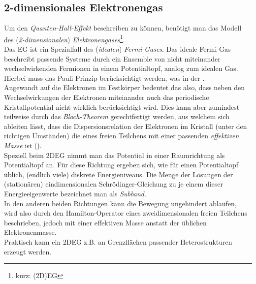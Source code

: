 \subsection{2-dimensionales Elektronengas}
Um den \emph{Quanten-Hall-Effekt} beschreiben zu können, benötigt man das Modell des (\emph{2-dimensionalen}) \emph{Elektronengases}\footnote{kurz: (2D)EG}.\\
Das EG ist ein Spezialfall des (\emph{idealen}) \emph{Fermi-Gases}. Das ideale Fermi-Gas beschreibt passende Systeme durch ein Ensemble von nicht miteinander wechselwirkenden Fermionen in einem Potentialtopf, analog zum idealen Gas. Hierbei muss das Pauli-Prinzip berücksichtigt werden, was in der .\\
Angewandt auf die Elektronen im Festkörper bedeutet das also, dass neben den Wechselwirkungen der Elektronen miteinander auch das periodische Kristallpotential nicht wirklich berücksichtigt wird. Dies kann aber zumindest teilweise durch das \emph{Bloch-Theorem} gerechtfertigt werden, aus welchem sich ableiten lässt, dass die Dispersionsrelation der Elektronen im Kristall (unter den richtigen Umständen) die eines freien Teilchens mit einer passenden \emph{effektiven Masse} ist (\cite{Cz15}).\\
Speziell beim 2DEG nimmt man das Potential in einer Raumrichtung als Potentialtopf an. Für diese Richtung ergeben sich, wie für einen Potentialtopf üblich, (endlich viele) diskrete Energieniveaus. Die Menge der Lösungen der (stationären) eindimensionalen Schrödinger-Gleichung zu je einem dieser Energieeigenwerte bezeichnet man als \emph{Subband}.\\
In den anderen beiden Richtungen kann die Bewegung ungehindert ablaufen, wird also durch den Hamilton-Operator eines zweidimensionalen freien Teilchens beschrieben, jedoch mit einer effektiven Masse anstatt der üblichen Elektronenmasse.\\
Praktisch kann ein 2DEG z.B. an Grenzflächen passender Heterostrukturen erzeugt werden. 
 
